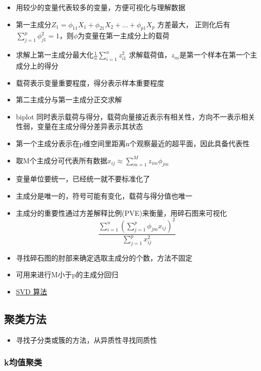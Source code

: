 \documentclass[
]{book}
\providecommand{\tightlist}{%
  \setlength{\itemsep}{0pt}\setlength{\parskip}{0pt}}
\begin{document}
\begin{itemize}
\tightlist
\item
  用较少的变量代表较多的变量，方便可视化与理解数据
\item
  第一主成分\(Z_1 = \phi_{11} X_1 + \phi_{21}X_2 + ... + \phi_{p1} X_p\) 方差最大， 正则化后有\(\sum_{j = 1}^p \phi_{j1}^2 = 1\)，则\(\phi\)为变量在第一主成分上的载荷
\item
  求解上第一主成分最大化\(\frac{1}{n} \sum_{i = 1}^{n} z_{i1}^2\) 求解载荷值，\(z_{ni}\)是第一个样本在第一个主成分上的得分
\item
  载荷表示变量重要程度，得分表示样本重要程度
\item
  第二主成分与第一主成分正交求解
\item
  biplot 同时表示载荷与得分，载荷向量接近表示有相关性，方向不一表示相关性弱，变量在主成分得分差异表示其状态
\item
  第一个主成分表示在p维空间里距离n个观察最近的超平面，因此具备代表性
\item
  取M个主成分可代表所有数据\(x_{ij} \approx \sum_{m = 1}^M z_{im} \phi_{jm}\)
\item
  变量单位要统一，已经统一就不要标准化了
\item
  主成分是唯一的，符号可能有变化，载荷与得分值也唯一
\item
  主成分的重要性通过方差解释比例(PVE)来衡量，用碎石图来可视化\[\frac{\sum_{i = 1}^n (\sum_{j =1}^p \phi_{jm} x_{ij})^2}{\sum_{j =1}^p x_{ij}^2}\]
\item
  寻找碎石图的肘部来确定选取主成分的个数，方法不固定
\item
  可用来进行M小于p的主成分回归
\item
  \href{https://github.com/j2kun/svd}{SVD 算法}
\end{itemize}

\hypertarget{ux805aux7c7bux65b9ux6cd5}{%
\subsection{聚类方法}\label{ux805aux7c7bux65b9ux6cd5}}

\begin{itemize}
\tightlist
\item
  寻找子分类或簇的方法，从异质性寻找同质性
\end{itemize}

\hypertarget{kux5747ux503cux805aux7c7b}{%
\subsubsection{k均值聚类}\label{kux5747ux503cux805aux7c7b}}
\end{document}
